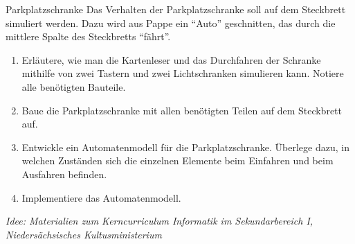 \begin{projekt}{Parkplatzschranke}
	\medskip
	Das Verhalten der Parkplatzschranke soll auf dem Steckbrett simuliert werden. Dazu wird aus Pappe ein \enquote{Auto} geschnitten, das durch die mittlere Spalte des Steckbretts \enquote{fährt}.
	
	\begin{enumerate}[label=\alph*), itemsep=0mm, parsep=0mm]
		\item Erläutere, wie man die Kartenleser und das Durchfahren der Schranke mithilfe von zwei Tastern und zwei Lichtschranken simulieren kann. Notiere alle benötigten Bauteile.
		\item Baue die Parkplatzschranke mit allen benötigten Teilen auf dem Steckbrett auf.
		\item Entwickle ein Automatenmodell für die Parkplatzschranke. Überlege dazu, in welchen Zuständen sich die einzelnen Elemente beim Einfahren und beim Ausfahren befinden.
		\item Implementiere das Automatenmodell.
	\end{enumerate}
	{\scriptsize\emph{Idee: Materialien zum Kerncurriculum Informatik im Sekundarbereich I, Niedersächsisches Kultusministerium}}
\end{projekt}

%

